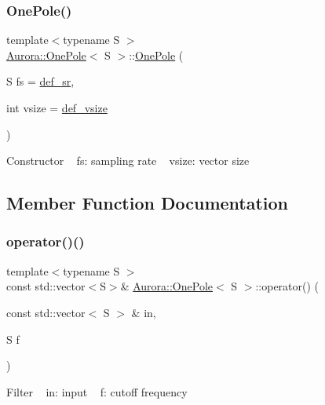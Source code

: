 \subsubsection{\texorpdfstring{One\+Pole()}{OnePole()}}
{\footnotesize\ttfamily template$<$typename S $>$ \\
\hyperlink{class_aurora_1_1_one_pole}{Aurora\+::\+One\+Pole}$<$ S $>$\+::\hyperlink{class_aurora_1_1_one_pole}{One\+Pole} (\begin{DoxyParamCaption}\item[{S}]{fs = {\ttfamily \hyperlink{namespace_aurora_ad49263d809bea98dd422e95bc91bc03e}{def\+\_\+sr}},  }\item[{int}]{vsize = {\ttfamily \hyperlink{namespace_aurora_afaaddf667a06e7ce23c667a8b7295263}{def\+\_\+vsize}} }\end{DoxyParamCaption})\hspace{0.3cm}{\ttfamily [inline]}}

Constructor ~\newline
fs\+: sampling rate ~\newline
vsize\+: vector size 

\subsection{Member Function Documentation}
\mbox{\label{class_aurora_1_1_one_pole_a34c297cdef0928ffd6e13e0603c5ef9d}} 
\subsubsection{\texorpdfstring{operator()()}{operator()()}\hspace{0.1cm}{\footnotesize\ttfamily [1/2]}}
{\footnotesize\ttfamily template$<$typename S $>$ \\
const std\+::vector$<$S$>$\& \hyperlink{class_aurora_1_1_one_pole}{Aurora\+::\+One\+Pole}$<$ S $>$\+::operator() (\begin{DoxyParamCaption}\item[{const std\+::vector$<$ S $>$ \&}]{in,  }\item[{S}]{f }\end{DoxyParamCaption})\hspace{0.3cm}{\ttfamily [inline]}}

Filter ~\newline
in\+: input ~\newline
f\+: cutoff frequency ~\newline
\mbox{\label{class_aurora_1_1_one_pole_ab126ef60b5f354c5aec0b62636bbb01d}} 
